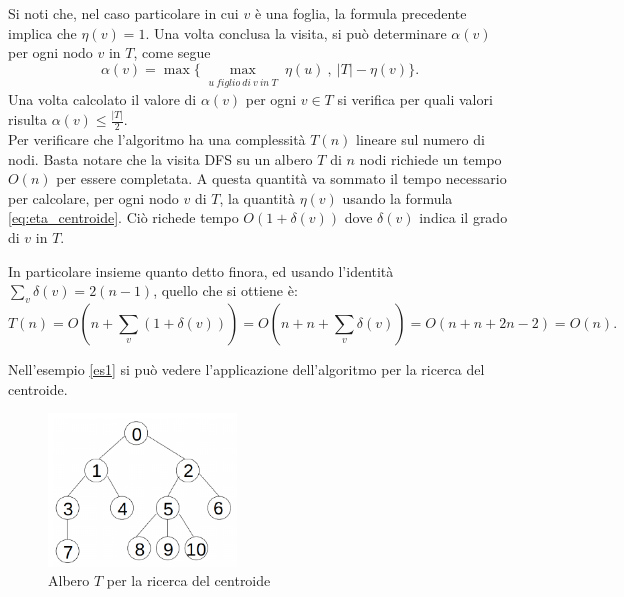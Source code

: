 Si noti che, nel caso particolare in cui $v$ è una foglia, la formula precedente implica che $\eta(v)=1$.
Una volta conclusa la visita, si pu\`o determinare $ \alpha(v) $ per ogni nodo $ v $ in $ T $, come segue
\[ \alpha(v) = \max\{ \max_{\substack{u \ figlio \ di \ v \ in \ T}} {\eta(u)} \ , \ |T| - \eta(v) \}. \]
\noindent Una volta calcolato il valore di $ \alpha(v) $ per ogni $  v \in T $ si verifica per quali valori  risulta $\alpha(v)\le\frac{|T|}{2}$.\\
Per verificare che l'algoritmo ha una complessit\`a $ T(n) $ lineare sul numero di nodi.
Basta notare che la visita DFS su un albero $ T $ di $ n $ nodi richiede un tempo $ O(n) $ per essere completata.
%
%
A questa quantità va sommato il tempo necessario per calcolare, per ogni nodo $v$ di $T$, la quantità $\eta(v)$ usando la formula \eqref{eq:eta_centroide}. Ciò richede tempo $O(1 + \delta(v))$ dove $\delta(v)$ indica il grado di $v$ in $T$.

In particolare insieme quanto detto finora, ed usando l'identità $\sum_{v} \delta(v) = 2(n-1)$, quello che si ottiene \`e:
\[  T(n) = O(n + \sum_{v}(1+\delta(v)))= O(n + n + \sum_{v}\delta(v)) = O(n+n+2n-2)=O(n).
\] 

Nell'esempio \ref{es1} si pu\`o vedere l'applicazione dell'algoritmo per la ricerca del centroide.
	\begin{figure}[htbp]
		\centering
		\includegraphics[width=5cm]{capitolo3/grafo2}
		\caption{Albero $ T $  per la ricerca del centroide} 
		\label{fig:2}
\end{figure}

